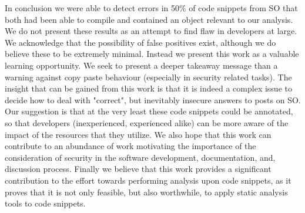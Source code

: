 \documentclass[10pt, conference]{IEEEtran}
\begin{document}
In conclusion we were able to detect errors in 50\% of code snippets from SO that both had been able to compile and contained an object relevant to our analysis. We do not present these results as an attempt to find flaw in developers at large. We acknowledge that the possibility of false positives exist, although we do believe these to be extremely minimal. Instead we present this work as a valuable learning opportunity. We seek to present a deeper takeaway message than a warning against copy paste behaviour (especially in security related tasks). The insight that can be gained from this work is that it is indeed a complex issue to decide how to deal with "correct", but inevitably insecure answers to posts on SO. Our suggestion is that at the very least these code snippets could be annotated, so that developers (inexperienced, experienced alike) can be more aware of the impact of the resources that they utilize. We also hope that this work can contribute to an abundance of work motivating the importance of the consideration of security in the software development, documentation, and, discussion process. Finally we believe that this work provides a significant contribution to the effort towards performing analysis upon code snippets, as it proves that it is not only feasible, but also worthwhile, to apply static analysis tools to code snippets.

\printbibliography
\end{document}

